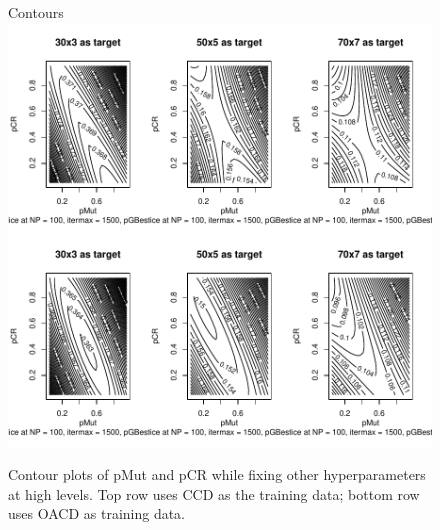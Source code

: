 \documentclass{beamer}
\begin{document}
\begin{frame}
\begin{figure}{Contours}
\centering
\includegraphics[height=7cm width=15cm]{../chapters/DE/pdfs/contours}
\caption{Contour plots of pMut and pCR while fixing other hyperparameters at high levels. Top row uses CCD as the training data; bottom row uses OACD as training data.}
\label{fig:contours}
\end{figure}
\end{frame}


\end{document}
